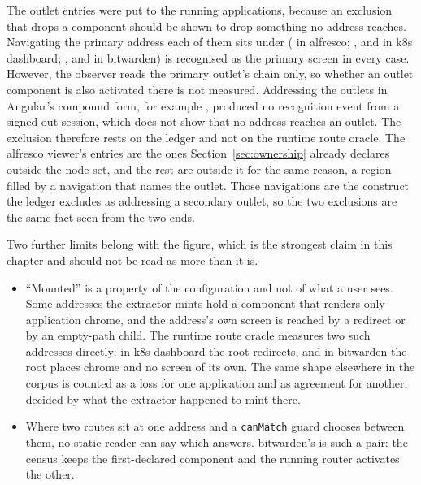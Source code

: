 The outlet entries were put to the running applications, because an exclusion that drops a component
should be shown to drop something no address reaches. Navigating the primary address each of them
sits under ( in alfresco; ,  and
 in k8s dashboard; ,  and  in
bitwarden) is recognised as the primary screen in every case. However, the observer reads the primary
outlet's chain only, so whether an outlet component is also activated there is not measured.
Addressing the outlets in Angular's compound form, for example , produced no
recognition event from a signed-out session, which does not show that no address reaches an outlet. The exclusion therefore
rests on the ledger and not on the runtime route oracle. The alfresco viewer's entries are the ones
Section~\ref{sec:ownership} already declares outside the node set, and the rest are outside it for the
same reason, a region filled by a navigation that names the outlet. Those navigations are the construct
the ledger excludes as addressing a secondary outlet, so the two exclusions are the same fact seen from
the two ends.

\begin{table}[t]\footnotesize
\caption{Every route entry of Table~\ref{tab:probe}, in the one bucket it falls in.
\emph{One address} counts entries that a surviving entry at the same address already
answers for. \emph{Named outlet} and \emph{Matcher} are the two exclusions that drop a
component the application places (\ProbeOutletScreens{} and \ProbeMatcherScreens{}
entries, \ProbeUnaddressableScreens{} in all), and the rest place no component at any
address. This table and Table~\ref{tab:probe} are produced only if the
buckets sum to the route total and every exclusion that drops a component-bearing entry is
named here.}
\label{tab:probe-closure}
\TabProbeClosure
\end{table}

Two further limits belong with the \ProbeInvented{} figure, which is the strongest claim in this
chapter and should not be read as more than it is.

\begin{itemize}
\item ``Mounted'' is a property of the configuration and not of what a user sees. Some addresses the
extractor mints hold a component that renders only application chrome, and the address's own screen
is reached by a redirect or by an empty-path child. The runtime route oracle measures two such addresses directly:
in k8s dashboard the root redirects, and in bitwarden the root places chrome and no screen of its
own. The same shape elsewhere in the corpus is counted as a loss for one application and as
agreement for another, decided by what the extractor happened to mint there.
\item Where two routes sit at one address and a \texttt{canMatch} guard chooses between them, no
static reader can say which answers. bitwarden's  is such a pair: the census keeps the
first-declared component and the running router activates the other.
\end{itemize}

